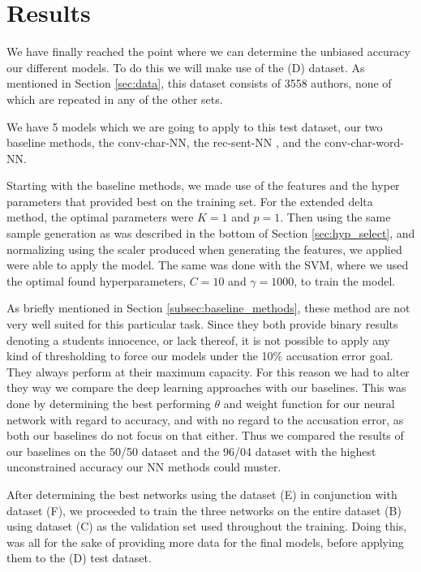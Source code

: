 \section{Results} \label{sec:results}

We have finally reached the point where we can determine the unbiased accuracy
our different models. To do this we will make use of the (D) dataset. As
mentioned in Section \ref{sec:data}, this dataset consists of 3558 authors,
none of which are repeated in any of the other sets.

We have 5 models which we are going to apply to this test dataset, our
two baseline methods, the \gls{conv-char-NN}, the \gls{rec-sent-NN} , and the
\gls{conv-char-word-NN}.

Starting with the baseline methods, we made use of the features and the
hyper parameters that provided best on the training set. For the extended
delta method, the optimal parameters were $K=1$ and $p = 1$. Then using
the same sample generation as was described in the bottom of Section
\ref{sec:hyp_select}, and normalizing using the scaler produced when
generating the features, we applied were able to apply the model. The same
was done with the \gls{SVM}, where we used the optimal found hyperparameters, $C=10$
and $\gamma = 1000$, to train the model. 

As briefly mentioned in Section \ref{subsec:baseline_methods}, these method are
not very well suited for this particular task. Since they both provide binary
results denoting a students innocence, or lack thereof, it is not possible to
apply any kind of thresholding to force our models under the 10\% accusation
error goal. They always perform at their maximum capacity. For this reason
we had to alter they way we compare the deep learning approaches with our
baselines. This was done by determining the best performing $\theta$ and weight
function for our neural network with regard to accuracy, and with no regard to
the accusation error, as both our baselines do not focus on that either. Thus we
compared the results of our baselines on the 50/50 dataset and the 96/04 dataset
with the highest unconstrained accuracy our \gls{NN} methods could muster.

After determining the best networks using the dataset (E) in conjunction with
dataset (F), we proceeded to train the three networks on the entire dataset (B)
using dataset (C) as the validation set used throughout the training. Doing
this, was all for the sake of providing more data for the final models, before
applying them to the (D) test dataset.

